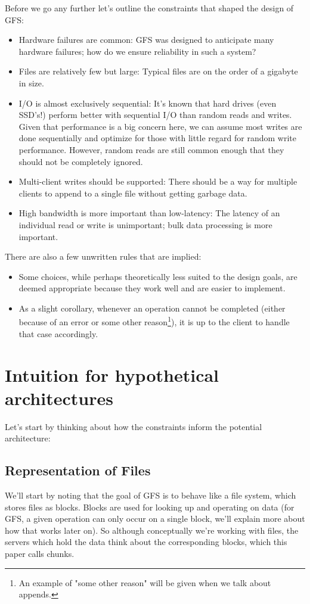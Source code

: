\documentclass[11pt]{article}
\begin{document}
Before we go any further let's outline the constraints that shaped the design of GFS:
\begin{itemize}
\item Hardware failures are common: GFS was designed to anticipate many hardware failures; how do we ensure reliability in such a system?
\item Files are relatively few but large: Typical files are on the order of a gigabyte in size.
\item I/O is almost exclusively sequential: It's known that hard drives (even SSD's!) perform better with sequential I/O than random reads and writes. Given that performance
is a big concern here, we can assume most writes are done sequentially and optimize for those with little regard for random write performance. However,
random reads are still common enough that they should not be completely ignored.
\item Multi-client writes should be supported: There should be a way for multiple clients to append to a single file without getting garbage data.
\item High bandwidth is more important than low-latency: The latency of an individual read or write is unimportant; bulk data processing is more important.
\end{itemize}

There are also a few unwritten rules that are implied:
\begin{itemize}
\item Some choices, while perhaps theoretically less suited to the design goals, are deemed appropriate because they work well and are easier to implement.
\item As a slight corollary, whenever an operation cannot be completed (either because of an error or some other reason\footnote{An example of "some other reason" will be given when we talk about appends.}), it is up to the client to handle that case accordingly.
\end{itemize}

\section*{Intuition for hypothetical architectures}
\label{sec:org24746bf}

Let's start by thinking about how the constraints inform the potential architecture:

\subsection*{Representation of Files}
\label{sec:org71e4aa6}
We'll start by noting that the goal of GFS is to behave like a file system, which stores files as blocks. Blocks are used for looking up and operating on data (for GFS,
a given operation can only occur on a single block, we'll explain more about how that works later on). So although conceptually we're working with files,
the servers which hold the data think about the corresponding blocks, which this paper calls chunks.
\end{document}
